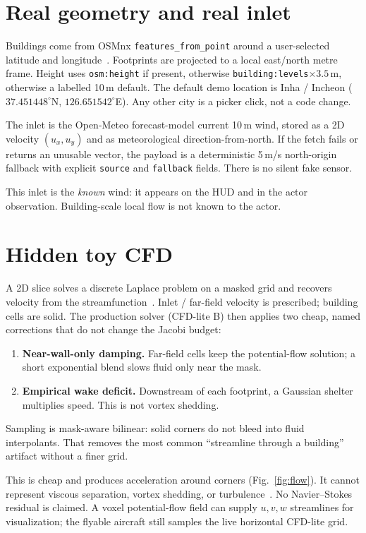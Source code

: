 \documentclass[11pt]{article}
\begin{document}
\section{Real geometry and real inlet}

Buildings come from OSMnx \texttt{features\_from\_point} around a user-selected latitude and longitude~\cite{boeing2017osmnx}.
Footprints are projected to a local east/north metre frame.
Height uses \texttt{osm:height} if present, otherwise \texttt{building:levels}$\times 3.5$\,m, otherwise a labelled 10\,m default.
The default demo location is Inha / Incheon ($37.451448^\circ$N, $126.651542^\circ$E).
Any other city is a picker click, not a code change.

The inlet is the Open-Meteo forecast-model current 10\,m wind, stored as a 2D velocity $(u_x,u_y)$ and as meteorological direction-from-north.
If the fetch fails or returns an unusable vector, the payload is a deterministic 5\,m/s north-origin fallback with explicit \texttt{source} and \texttt{fallback} fields.
There is no silent fake sensor.

This inlet is the \emph{known} wind: it appears on the HUD and in the actor observation.
Building-scale local flow is not known to the actor.

\section{Hidden toy CFD}
\label{sec:flow}

A 2D slice solves a discrete Laplace problem on a masked grid and recovers velocity from the streamfunction~\cite{anderson2017fundamentals}.
Inlet / far-field velocity is prescribed; building cells are solid.
The production solver (CFD-lite B) then applies two cheap, named corrections that do not change the Jacobi budget:
\begin{enumerate}
  \item \textbf{Near-wall-only damping.} Far-field cells keep the potential-flow solution; a short exponential blend slows fluid only near the mask.
  \item \textbf{Empirical wake deficit.} Downstream of each footprint, a Gaussian shelter multiplies speed. This is not vortex shedding.
\end{enumerate}
Sampling is mask-aware bilinear: solid corners do not bleed into fluid interpolants.
That removes the most common ``streamline through a building'' artifact without a finer grid.

This is cheap and produces acceleration around corners (Fig.~\ref{fig:flow}).
It cannot represent viscous separation, vortex shedding, or turbulence~\cite{blocken2014cfd}.
No Navier--Stokes residual is claimed.
A voxel potential-flow field can supply $u,v,w$ streamlines for visualization; the flyable aircraft still samples the live horizontal CFD-lite grid.
\end{document}
